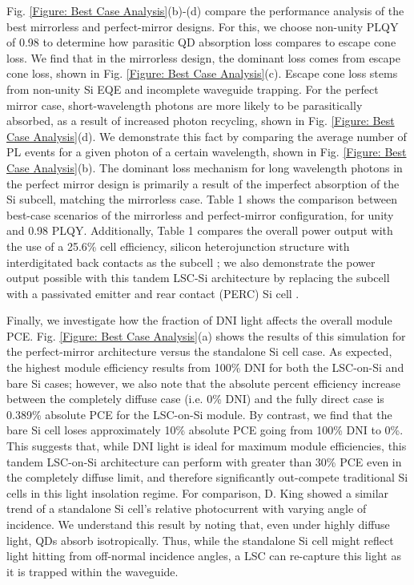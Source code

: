 \documentclass[conference]{./pvsctran}
\begin{document}
		Fig. \ref{Figure: Best Case Analysis}(b)-(d) compare the performance analysis of the best mirrorless and perfect-mirror designs. For this, we choose non-unity PLQY of 0.98 to determine how parasitic QD absorption loss compares to escape cone loss. We find that in the mirrorless design, the dominant loss comes from escape cone loss, shown in Fig. \ref{Figure: Best Case Analysis}(c). Escape cone loss stems from non-unity Si EQE and incomplete waveguide trapping. For the perfect mirror case, short-wavelength photons are more likely to be parasitically absorbed, as a result of increased photon recycling, shown in Fig. \ref{Figure: Best Case Analysis}(d). We demonstrate this fact by comparing the average number of PL events for a given photon of a certain wavelength, shown in Fig. \ref{Figure: Best Case Analysis}(b). The dominant loss mechanism for long wavelength photons in the perfect mirror design is primarily a result of the imperfect absorption of the Si subcell, matching the mirrorless case. Table 1 shows the comparison between best-case scenarios of the mirrorless and perfect-mirror configuration, for unity and 0.98 PLQY. Additionally, Table 1 compares the overall power output with the use of a 25.6\% cell efficiency, silicon heterojunction structure with interdigitated back contacts as the subcell \cite{Masuko2014}; we also demonstrate the power output possible with this tandem LSC-Si architecture by replacing the subcell with a passivated emitter and rear contact (PERC) Si cell \cite{Padmanabhan2016}.
		
		Finally, we investigate how the fraction of DNI light affects the overall module PCE. Fig. \ref{Figure: Best Case Analysis}(a) shows the results of this simulation for the perfect-mirror architecture versus the standalone Si cell case. As expected, the highest module efficiency results from 100\% DNI for both the LSC-on-Si and bare Si cases; however, we also note that the absolute percent efficiency increase between the completely diffuse case (i.e. 0\% DNI) and the fully direct case is 0.389\% absolute PCE for the LSC-on-Si module.  By contrast, we find that the bare Si cell loses approximately 10\% absolute PCE going from 100\% DNI to 0\%. This suggests that, while DNI light is ideal for maximum module efficiencies, this tandem LSC-on-Si architecture can perform with greater than 30\% PCE even in the completely diffuse limit, and therefore significantly out-compete traditional Si cells in this light insolation regime.  For comparison, D. King \cite{King1997} showed a similar trend of a standalone Si cell’s relative photocurrent with varying angle of incidence.  We understand this result by noting that, even under highly diffuse light, QDs absorb isotropically.  Thus, while the standalone Si cell might reflect light hitting from off-normal incidence angles, a LSC can re-capture this light as it is trapped within the waveguide.  
		
\end{document}
